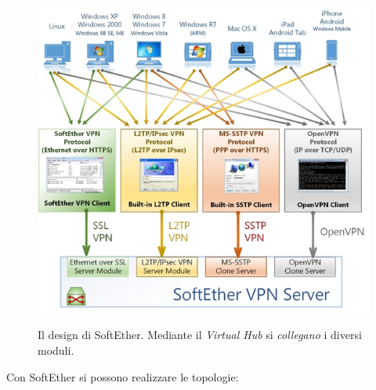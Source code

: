 \begin{figure}
  \includegraphics[scale=0.45]{img/softether_scheme}
  \label{fig:softether-archi}
  \caption[Il design di SoftEther]{Il design di SoftEther. Mediante il \textit{Virtual Hub} si \textit{collegano} i diversi
  moduli.}
\end{figure}
Con SoftEther si possono realizzare le topologie:
